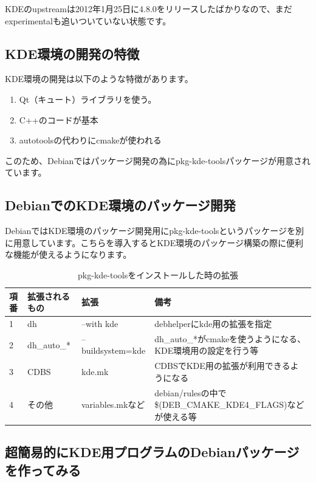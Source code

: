 \documentclass[mingoth,a4paper]{jsarticle}
\begin{document}
KDEのupstreamは2012年1月25日に4.8.0をリリースしたばかりなので、まだ
experimentalも追いついていない状態です。

\subsection{KDE環境の開発の特徴}

KDE環境の開発は以下のような特徴があります。

\begin{enumerate}
\item Qt（キュート）ライブラリを使う。
\item C++のコードが基本
\item autotoolsの代わりにcmakeが使われる
\end{enumerate}

このため、Debianではパッケージ開発の為にpkg-kde-toolsパッケージが用意されています。

\subsection{DebianでのKDE環境のパッケージ開発}

 DebianではKDE環境のパッケージ開発用にpkg-kde-toolsというパッケージを別に用意しています。こちらを導入するとKDE環境のパッケージ構築の際に便利な機能が使えるようになります。

\begin{table}[ht]
\begin{center}
\begin{tabular}{|l|l|l|l|}
\hline 
項番&拡張されるもの&拡張&備考\\
\hline
1&dh& --with kde & debhelperにkde用の拡張を指定\\
\hline
2&dh\_auto\_*& --buildsystem=kde & dh\_auto\_*がcmakeを使うようになる、KDE環境用の設定を行う等\\
\hline
3&CDBS&kde.mk& CDBSでKDE用の拡張が利用できるようになる\\
\hline
4&その他&variables.mkなど& debian/rulesの中で\$(DEB\_CMAKE\_KDE4\_FLAGS)などが使える等\\
\hline
\end{tabular}
\caption{\label{tab:pkg-kde-tools-inst}pkg-kde-toolsをインストールした時の拡張}
\end{center}
\end{table}

\subsection{超簡易的にKDE用プログラムのDebianパッケージを作ってみる}
\end{document}
